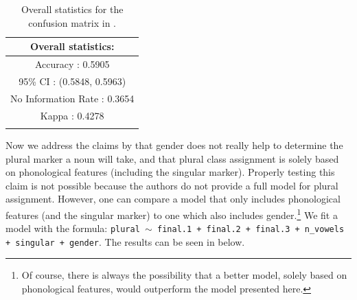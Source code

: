 \begin{table}[!htpb]
  \centering
  \begin{tabular}{c}
    \lsptoprule
    Overall statistics: \\
    \midrule
    Accuracy : 0.5905\\
    95\% CI : (0.5848, 0.5963)\\
    No Information Rate : 0.3654\\
    Kappa : 0.4278\\
    \lspbottomrule
  \end{tabular}
  \caption{Overall statistics for the confusion matrix in .}\label{tab:plural-romanian-stats}
\end{table}

Now we address the claims by \textcite{Bateman.2010} that gender does not really help to determine the plural marker a noun will take, and that plural class assignment is solely based on phonological features (including the singular marker). Properly testing this claim is not possible because the authors do not provide a full model for plural assignment. However, one can compare a model that only includes phonological features (and the singular marker) to one which also includes gender.\footnote{Of course, there is always the possibility that a better model, solely based on phonological features, would outperform the model presented here.} We fit a model with the formula: \texttt{plural $\sim$ final.1 + final.2 + final.3 + n\_vowels + singular + gender}. The results can be seen in  below.

